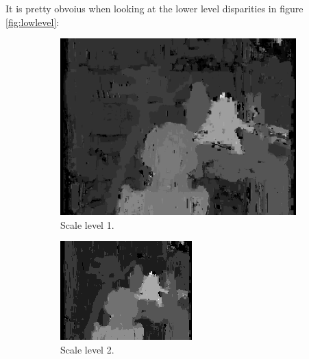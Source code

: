 \documentclass[12pt,a4paper,oneside,final]{article}
\begin{document}
{\color{red} It is pretty obvoius when looking at the lower level disparities in figure \ref{fig:lowlevel}:
\begin{figure}[H]
\centering
\begin{subfigure}[b]{0.24\textwidth}
	\includegraphics[width=\textwidth]{disparity1.png}
	\caption{Scale level 1.}
\end{subfigure}
\begin{subfigure}[b]{0.24\textwidth}
	\includegraphics[width=\textwidth]{disparity2.png}
	\caption{Scale level 2.}
\end{subfigure}
\begin{subfigure}[b]{0.24\textwidth}

\end{subfigure}
\end{figure}}
\end{document}
